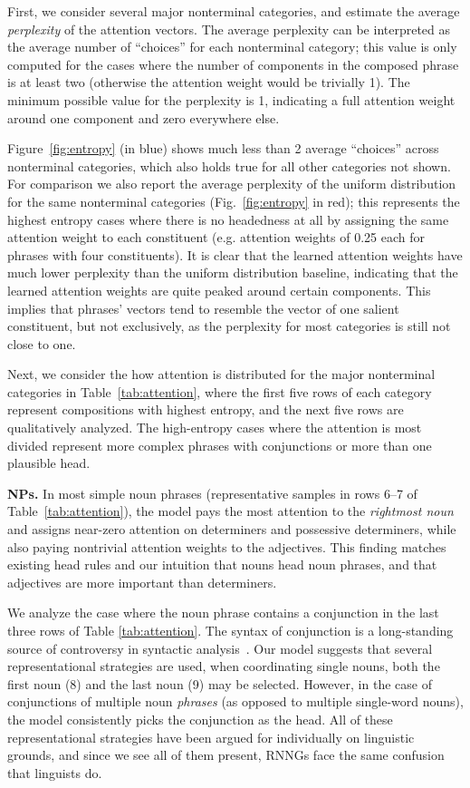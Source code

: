 \documentclass[11pt]{article}
\newcommand{\ask}[1]{\textcolor{orange}{{\textbf{[#1 --\textsc{ask}]}}}}
\renewcommand{\ask}[1]{}
\begin{document}
First, we consider several major nonterminal categories, and estimate the average \emph{perplexity} of the attention vectors. The average perplexity can be interpreted as the average number of ``choices'' for each nonterminal category; this value is only computed for the cases where the number of components in the composed phrase is at least two (otherwise the attention weight would be trivially 1). The minimum possible value for the perplexity is 1, indicating a full attention weight around one component and zero everywhere else. 

Figure~\ref{fig:entropy} (in blue) shows much less than 2 average ``choices'' across nonterminal categories, which also holds true for all other categories not shown. For comparison we also report the average perplexity of the uniform distribution for the same nonterminal categories (Fig.~\ref{fig:entropy} in red); this represents the highest entropy cases where there is no headedness at all by assigning the same attention weight to each constituent (e.g. attention weights of 0.25 each for phrases with four constituents). It is clear that the learned attention weights have much lower perplexity than the uniform distribution baseline, indicating that the learned attention weights are quite peaked around certain components. This implies that phrases' vectors tend to resemble the vector of one salient constituent, but not exclusively, as the perplexity for most categories is still not close to one. 

Next, we consider the how attention is distributed for the major nonterminal categories in Table~\ref{tab:attention}, where the first five rows of each category represent compositions with highest entropy, and the next five rows are qualitatively analyzed.  The high-entropy cases where the attention is most divided represent more complex phrases with conjunctions or more than one plausible head.\ask{Make sure this is not controversial}

\textbf{NPs.} In most simple noun phrases (representative samples in rows 6--7 of Table~\ref{tab:attention}), the model pays the most attention to the \emph{rightmost noun} and assigns near-zero attention on determiners and possessive determiners, while also paying nontrivial attention weights to the adjectives. This finding matches existing head rules and our intuition that nouns head noun phrases, and that adjectives are more important than determiners. 

We analyze the case where the noun phrase contains a conjunction in the last three rows of Table \ref{tab:attention}. The syntax of conjunction is a long-standing source of controversy in syntactic analysis~\cite[\emph{inter alia}]{johannessen:1998}. Our model suggests that several representational strategies are used, when coordinating single nouns, both the first noun (8) and the last noun (9) may be selected. However, in the case of conjunctions of multiple noun \emph{phrases} (as opposed to multiple single-word nouns), the model consistently picks the conjunction as the head. All of these representational strategies have been argued for individually on linguistic grounds, and since we see all of them present, RNNGs face the same confusion that linguists do.
\end{document}
